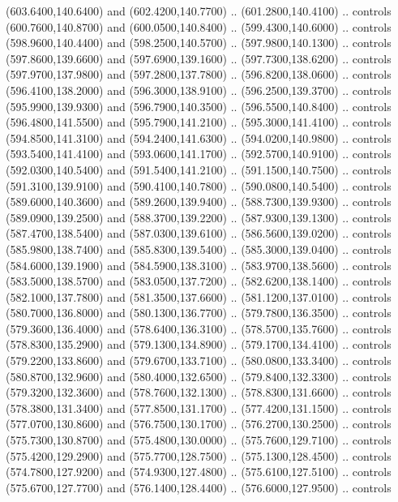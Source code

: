 {\begin{scope}[y=0.80pt, x=0.80pt, yscale=-1, xscale=1, inner sep=0pt, outer sep=0pt, #1]
      (603.6400,140.6400) and (602.4200,140.7700) .. (601.2800,140.4100) .. controls
      (600.7600,140.8700) and (600.0500,140.8400) .. (599.4300,140.6000) .. controls
      (598.9600,140.4400) and (598.2500,140.5700) .. (597.9800,140.1300) .. controls
      (597.8600,139.6600) and (597.6900,139.1600) .. (597.7300,138.6200) .. controls
      (597.9700,137.9800) and (597.2800,137.7800) .. (596.8200,138.0600) .. controls
      (596.4100,138.2000) and (596.3000,138.9100) .. (596.2500,139.3700) .. controls
      (595.9900,139.9300) and (596.7900,140.3500) .. (596.5500,140.8400) .. controls
      (596.4800,141.5500) and (595.7900,141.2100) .. (595.3000,141.4100) .. controls
      (594.8500,141.3100) and (594.2400,141.6300) .. (594.0200,140.9800) .. controls
      (593.5400,141.4100) and (593.0600,141.1700) .. (592.5700,140.9100) .. controls
      (592.0300,140.5400) and (591.5400,141.2100) .. (591.1500,140.7500) .. controls
      (591.3100,139.9100) and (590.4100,140.7800) .. (590.0800,140.5400) .. controls
      (589.6000,140.3600) and (589.2600,139.9400) .. (588.7300,139.9300) .. controls
      (589.0900,139.2500) and (588.3700,139.2200) .. (587.9300,139.1300) .. controls
      (587.4700,138.5400) and (587.0300,139.6100) .. (586.5600,139.0200) .. controls
      (585.9800,138.7400) and (585.8300,139.5400) .. (585.3000,139.0400) .. controls
      (584.6000,139.1900) and (584.5900,138.3100) .. (583.9700,138.5600) .. controls
      (583.5000,138.5700) and (583.0500,137.7200) .. (582.6200,138.1400) .. controls
      (582.1000,137.7800) and (581.3500,137.6600) .. (581.1200,137.0100) .. controls
      (580.7000,136.8000) and (580.1300,136.7700) .. (579.7800,136.3500) .. controls
      (579.3600,136.4000) and (578.6400,136.3100) .. (578.5700,135.7600) .. controls
      (578.8300,135.2900) and (579.1300,134.8900) .. (579.1700,134.4100) .. controls
      (579.2200,133.8600) and (579.6700,133.7100) .. (580.0800,133.3400) .. controls
      (580.8700,132.9600) and (580.4000,132.6500) .. (579.8400,132.3300) .. controls
      (579.3200,132.3600) and (578.7600,132.1300) .. (578.8300,131.6600) .. controls
      (578.3800,131.3400) and (577.8500,131.1700) .. (577.4200,131.1500) .. controls
      (577.0700,130.8600) and (576.7500,130.1700) .. (576.2700,130.2500) .. controls
      (575.7300,130.8700) and (575.4800,130.0000) .. (575.7600,129.7100) .. controls
      (575.4200,129.2900) and (575.7700,128.7500) .. (575.1300,128.4500) .. controls
      (574.7800,127.9200) and (574.9300,127.4800) .. (575.6100,127.5100) .. controls
      (575.6700,127.7700) and (576.1400,128.4400) .. (576.6000,127.9500) .. controls

\end{scope}}
